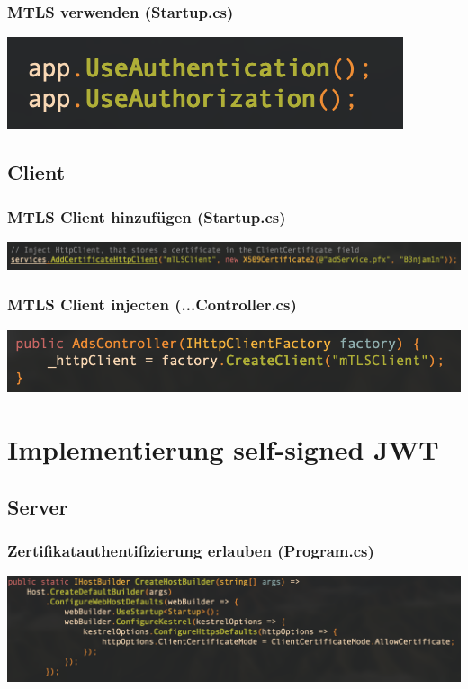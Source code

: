 \documentclass[14pt,a4paper]{extarticle}
\begin{document}
	\subsubsection*{MTLS verwenden (Startup.cs)}
	\begin{center}
		\includegraphics{images/UseMTLS.png}
	\end{center}
	\newpage

	\subsection{Client}
	\subsubsection*{MTLS Client hinzufügen (Startup.cs)}
	\begin{center}
		\includegraphics[width=\textwidth]{images/AddMTLSClient.png}
	\end{center}

	\subsubsection*{MTLS Client injecten (...Controller.cs)}
	\begin{center}
		\includegraphics[width=\textwidth]{images/InjectClient.png}
	\end{center}


	\newpage
	\section{Implementierung self-signed JWT}
	\subsection{Server}
	\subsubsection*{Zertifikatauthentifizierung erlauben (Program.cs)}
	\begin{center}
		\includegraphics[width=\textwidth]{images/AllowCerts.png}
	\end{center}
\end{document}
